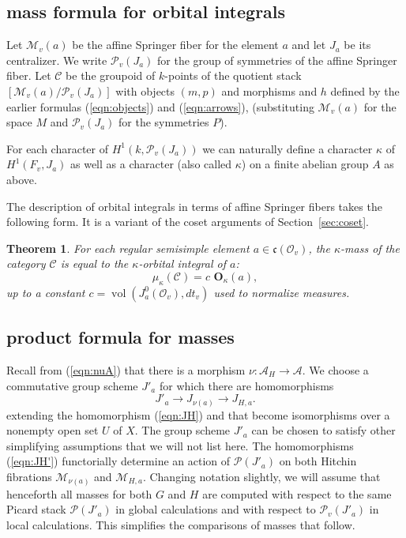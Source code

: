 \documentclass[brochure,english,12pt]{bourbaki}
\theoremstyle{plain}
\newtheorem{theorem}[equation]{Theorem}
\def\op#1{{\operatorname{#1}}}
\def\OO{{\mathbf O}}
\def\cc{\mathfrak{c}}
\def\A{{\mathcal A}}
\def\C{{\mathcal C}}
\def\M{{\mathcal M}}
\def\P{{\mathcal P}}
\def\O{{\mathcal O}}
\begin{document}
\subsection{mass formula for orbital integrals}


Let $\M_v(a)$ be the affine Springer fiber for the element $a$ and let
$J_a$ be its centralizer.  We write $\P_v(J_a)$ for the group of
symmetries of the affine Springer fiber.   Let $\C$ be the groupoid of $k$-points of
the quotient stack $[\M_v(a)/\P_v(J_a)]$ with objects $(m,p)$ and morphisms
and $h$ defined by the earlier formulas (\ref{eqn:objects}) and (\ref{eqn:arrows}),
(substituting $\M_v(a)$ for the space $M$ and $\P_v(J_a)$ for the symmetries $P$).

For each character of $H^1(k,\P_v(J_a))$ we can naturally define a
character $\kappa$ of $H^1(F_v,J_a)$ as well as a character (also
called $\kappa$) on a finite abelian group $A$ as above.

The description of orbital integrals in terms of affine Springer fibers
 takes the following form.  It is a variant of the coset arguments of Section~\ref{sec:coset}.


\begin{theorem}\label{lemma:orbital-mass}
For each regular semisimple element $a\in \cc(\O_v)$, 
the $\kappa$-mass of the category $\C$ is equal to the
$\kappa$-orbital integral of $a$:
\[
\mu_\kappa(\C) = c\,\, \OO_\kappa(a),
\]
up to a constant $c=\op{vol}(J^0_a(\O_v),dt_v)$ used to normalize measures.
\end{theorem}





\subsection{product formula for masses} 



Recall from (\ref{eqn:nuA}) that there is a morphism $\nu:\A_H\to\A$.
We choose a commutative group scheme $J'_a$
for which there are homomorphisms
\begin{equation}\label{eqn:JH'}
J'_a \to J_{\nu(a)} \to J_{H,a}.
\end{equation}
extending the homomorphism (\ref{eqn:JH}) and that become isomorphisms
over a nonempty open set $U$ of $X$.  The group scheme $J'_a$ can be
chosen to satisfy other simplifying assumptions that we will not list
here.  The homomorphisms (\ref{eqn:JH'}) functorially determine an
action of $\P(J'_a)$ on both Hitchin fibrations $\M_{\nu(a)}$ and
$\M_{H,a}$.  Changing notation slightly, we will assume that
henceforth all masses for both $G$ and $H$ are computed with respect
to the same Picard stack $\P(J'_a)$ in global calculations and with respect to
$\P_v(J'_a)$ in local calculations.  This simplifies the comparisons
of masses that follow.
\end{document}
